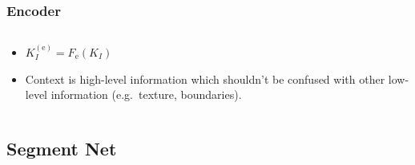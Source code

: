 \documentclass[12pt, aspectratio = 169, xcolor = x11names]{beamer}
\begin{document}
\begin{frame}
  \frametitle{Encoder}
  \begin{columns}
    \pause%
    \begin{column}{0.5\textwidth}
      \begin{itemize}[<+->]
        \item$K_I^\mathrm{(e)} = F_\mathrm{e}(K_I)$
        \item<+-|alert@+>Context is high-level information which shouldn't be
          confused with other low-level information (e.g.\ texture,
          boundaries).
      \end{itemize}
    \end{column}
  \end{columns}
\end{frame}

\subsection{Segment Net}%
\label{sub:segment_net}
\end{document}
